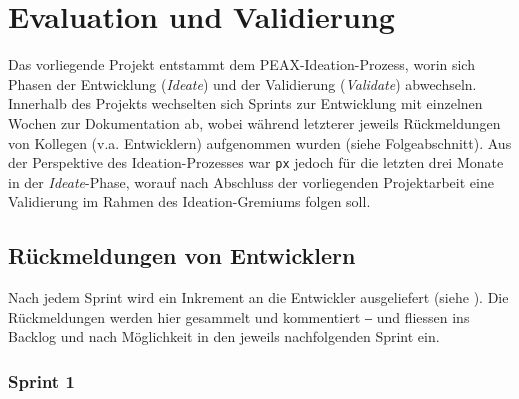 \section{Evaluation und Validierung}

Das vorliegende Projekt entstammt dem PEAX-Ideation-Prozess, worin sich Phasen der Entwicklung (\textit{Ideate}) und der Validierung (\textit{Validate}) abwechseln. Innerhalb des Projekts wechselten sich Sprints zur Entwicklung mit einzelnen Wochen zur Dokumentation ab, wobei während letzterer jeweils Rückmeldungen von Kollegen (v.a. Entwicklern) aufgenommen wurden (siehe Folgeabschnitt). Aus der Perspektive des Ideation-Prozesses war \texttt{px} jedoch für die letzten drei Monate in der \textit{Ideate}-Phase, worauf nach Abschluss der vorliegenden Projektarbeit eine Validierung im Rahmen des Ideation-Gremiums folgen soll.

\subsection{Rückmeldungen von Entwicklern}

Nach jedem Sprint wird ein Inkrement an die Entwickler ausgeliefert (siehe ). Die Rückmeldungen werden hier gesammelt und kommentiert ‒ und fliessen ins Backlog und nach Möglichkeit in den jeweils nachfolgenden Sprint ein.

\subsubsection{Sprint 1}
\label{sec:Feedback-Sprint1}

